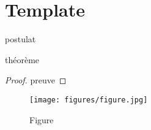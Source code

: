 	\section{Template}
		\begin{post}
			postulat
		\end{post}
		\begin{theorem}
			théorème
		\end{theorem}

		\begin{proof}
			preuve
			\end{proof}


		\begin{figure}
			\centering
			\texttt{[image: figures/figure.jpg]}
			\caption{Figure}
		\label{fig}
		\end{figure}
